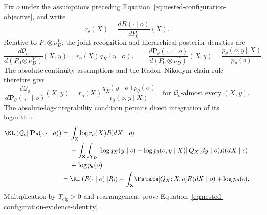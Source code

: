 Fix \(o\) under the assumptions preceding Equation~\eqref{eq:nested-configuration-objective}, and write
\begin{equation}
r_o(X)
=\frac{dR(\mathord\cdot\mid o)}{dP_0}(X).
\label{eq:appendix-configuration-radon-nikodym-density}
\end{equation}
Relative to \(P_0\otimes\nu_D^Y\), the joint recognition and hierarchical posterior densities are
\begin{equation}
\frac{d\mathcal Q_o}{d(P_0\otimes\nu_D^Y)}(X,y)
=r_o(X)q_X(y\mid o),
\qquad
\frac{d\mathbf P_\theta(\mathord\cdot,\mathord\cdot\mid o)}
{d(P_0\otimes\nu_D^Y)}(X,y)
=\frac{p_\theta(o,y\mid X)}{p_\theta(o)}.
\label{eq:appendix-hierarchical-densities}
\end{equation}
The absolute-continuity assumptions and the Radon--Nikodym chain rule therefore give
\begin{equation}
\frac{d\mathcal Q_o}
{d\mathbf P_\theta(\mathord\cdot,\mathord\cdot\mid o)}(X,y)
=r_o(X)
\frac{q_X(y\mid o)p_\theta(o)}
{p_\theta(o,y\mid X)}
\quad
\text{for \(\mathcal Q_o\)-almost every \((X,y)\)}.
\label{eq:appendix-hierarchical-radon-nikodym-ratio}
\end{equation}
The absolute-log-integrability condition permits direct integration of its logarithm:
\begin{align}
\KL\left(
\mathcal Q_o
\middle\Vert
\mathbf P_\theta(\mathord\cdot,\mathord\cdot\mid o)
\right)
={}&
\int_{\mathsf X}\log r_o(X)R(dX\mid o)
\notag\\
&+\int_{\mathsf X}\int_{\mathsf Y_D}
\left[
\log q_X(y\mid o)-\log p_\theta(o,y\mid X)
\right]
Q_X(dy\mid o)R(dX\mid o)
\notag\\
&+\log p_\theta(o)
\label{eq:appendix-hierarchical-kl-expansion}\\
={}&
\KL\left(R(\mathord\cdot\mid o)\middle\Vert P_0\right)
+\int_{\mathsf X}
\Fstate[Q_X;X,o]R(dX\mid o)
+\log p_\theta(o).
\notag
\end{align}
Multiplication by \(T_{\mathrm{cfg}}>0\) and rearrangement prove Equation~\eqref{eq:nested-configuration-evidence-identity}.

